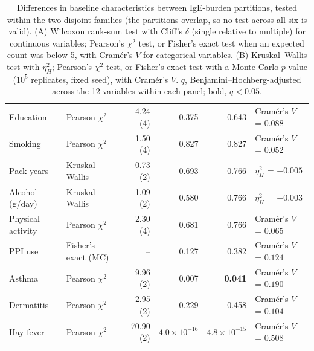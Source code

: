 \begin{table}[h!]
\begin{tabular}{l l r r r l}
Education & Pearson $\chi^2$ & 4.24 (4) & 0.375 & 0.643 & Cram\'er's $V$ = $0.088$ \\
Smoking & Pearson $\chi^2$ & 1.50 (4) & 0.827 & 0.827 & Cram\'er's $V$ = $0.052$ \\
Pack-years & Kruskal--Wallis & 0.73 (2) & 0.693 & 0.766 & $\eta^2_H$ = $-0.005$ \\
Alcohol (g/day) & Kruskal--Wallis & 1.09 (2) & 0.580 & 0.766 & $\eta^2_H$ = $-0.003$ \\
Physical activity & Pearson $\chi^2$ & 2.30 (4) & 0.681 & 0.766 & Cram\'er's $V$ = $0.065$ \\
PPI use & Fisher's exact (MC) & -- & 0.127 & 0.382 & Cram\'er's $V$ = $0.124$ \\
Asthma & Pearson $\chi^2$ & 9.96 (2) & 0.007 & \textbf{0.041} & Cram\'er's $V$ = $0.190$ \\
Dermatitis & Pearson $\chi^2$ & 2.95 (2) & 0.229 & 0.458 & Cram\'er's $V$ = $0.104$ \\
Hay fever & Pearson $\chi^2$ & 70.90 (2) & $4.0\times10^{-16}$ & \textbf{$4.8\times10^{-15}$} & Cram\'er's $V$ = $0.508$ \\
\hline
\end{tabular}
\caption{Differences in baseline characteristics between IgE-burden partitions, tested within the two disjoint families (the partitions overlap, so no test across all six is valid). (A) Wilcoxon rank-sum test with Cliff's $\delta$ (single relative to multiple) for continuous variables; Pearson's $\chi^2$ test, or Fisher's exact test when an expected count was below 5, with Cram\'er's $V$ for categorical variables. (B) Kruskal--Wallis test with $\eta^2_H$; Pearson's $\chi^2$ test, or Fisher's exact test with a Monte Carlo $p$-value ($10^5$ replicates, fixed seed), with Cram\'er's $V$. $q$, Benjamini--Hochberg-adjusted across the 12 variables within each panel; bold, $q < 0.05$.\label{tab:partition_tests}}
\end{table}
